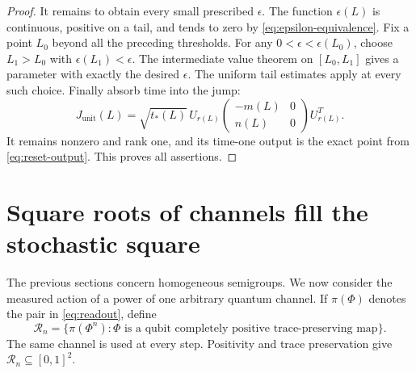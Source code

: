 \documentclass[11pt]{article}
\theoremstyle{definition}
\theoremstyle{remark}
\begin{document}
\begin{proof}
It remains to obtain every small prescribed \(\epsilon\). The function \(\epsilon(L)\) is continuous, positive on a tail, and tends to zero by \eqref{eq:epsilon-equivalence}. Fix a point \(L_0\) beyond all the preceding thresholds. For any \(0<\epsilon<\epsilon(L_0)\), choose \(L_1>L_0\) with \(\epsilon(L_1)<\epsilon\). The intermediate value theorem on \([L_0,L_1]\) gives a parameter with exactly the desired \(\epsilon\). The uniform tail estimates apply at every such choice. Finally absorb time into the jump:
\begin{equation}\label{eq:reset-actual-unit-jump}
 J_{\mathrm{unit}}(L)=\sqrt{t_*(L)}\,
 U_{r(L)}\begin{pmatrix}-m(L)&0\\n(L)&0\end{pmatrix}U_{r(L)}^T.
\end{equation}
It remains nonzero and rank one, and its time-one output is the exact point from \eqref{eq:reset-output}. This proves all assertions.
\end{proof}

\section{Square roots of channels fill the stochastic square}\label{sec:roots}

The previous sections concern homogeneous semigroups. We now consider the measured action of a power of one arbitrary quantum channel. If \(\pi(\Phi)\) denotes the pair in \eqref{eq:readout}, define
\begin{equation}\label{eq:root-layer}
 \mathcal R_n=\{\pi(\Phi^n):\Phi\text{ is a qubit completely positive trace-preserving map}\}.
\end{equation}
The same channel is used at every step. Positivity and trace preservation give \(\mathcal R_n\subseteq[0,1]^2\).
\end{document}
